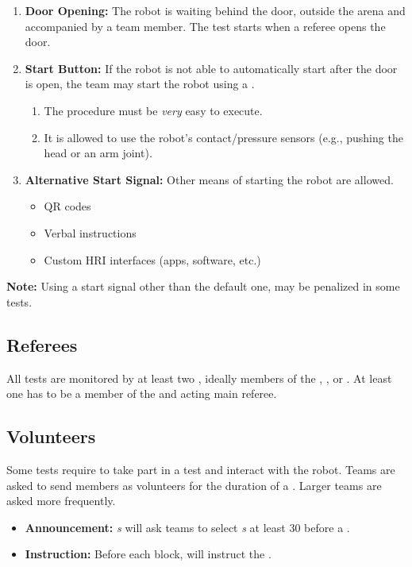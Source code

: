\begin{enumerate}
	\item \textbf{Door Opening:} The robot is waiting behind the door, outside the arena and accompanied by a team member.
	The test starts when a referee opens the door.

	\item \textbf{Start Button:} If the robot is not able to automatically start after the door is open, the team may start the robot using a \StartButton{}.
	\begin{enumerate}[nosep]
		\item The procedure must be \emph{very} easy to execute.
		\item It is allowed to use the robot's contact/pressure sensors (e.g., pushing the head or an arm joint).
	\end{enumerate}

	\item \textbf{Alternative Start Signal:} Other means of starting the robot are allowed.
	\begin{itemize}[nosep]
		\item QR codes
		\item Verbal instructions
		\item Custom HRI interfaces (apps, software, etc.)
	\end{itemize}
\end{enumerate}
\noindent\textbf{Note:} Using a start signal other than the default one, may be penalized in some tests.


\subsection{Referees}
\label{sec:rules:referees}
All tests are monitored by at least two \Referees{}, ideally members of the , , or . At least one has to be a member of the  and acting main referee.


\subsection{Volunteers}
\label{sec:rules:volunteers}
Some tests require \Volunteers{} to take part in a test and interact with the robot. Teams are asked to send members as volunteers for the duration of a \Testblock{}. Larger teams are asked more frequently. 
\begin{itemize}
	\item \textbf{Announcement:} \Referee\textit{s} will ask teams to select \Volunteer\textit{s} at least \SI{30}{\min} before a \Testblock{}.
	\item \textbf{Instruction:} Before each block, \Referees{} will instruct the \Volunteers{}.
\end{itemize}


